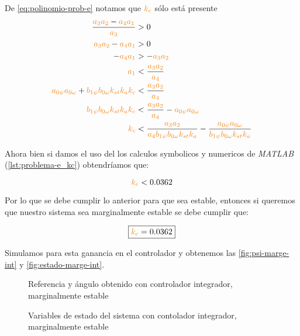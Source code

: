 De \eqref{eq:polinomio-prob-e} notamos que $\nara{k_{c}}$ sólo está presente
\begin{align} 
  \frac{\nara{a_3 a_2} - \nara{a_4 a_1}}{\nara{a_3}} &> 0 \\
  \nara{a_3 a_2} - \nara{a_4 a_1} &> 0 \\
  - \nara{a_4 a_1} &> - \nara{a_3 a_2} \\
  \nara{a_1} &< \frac{\nara{a_3 a_2}}{\nara{a_4}} \\
  \nara{a_{0\psi} a_{0\omega}} + \nara{b_{1\psi} b_{0\omega} k_{st} k_a k_c} &< \frac{\nara{a_3 a_2}}{\nara{a_4}} \\
  \nara{b_{1\psi} b_{0\omega} k_{st} k_a k_c} &< \frac{\nara{a_3 a_2}}{\nara{a_4}} - \nara{a_{0\psi} a_{0\omega}} \\
  \nara{k_c}  &< \frac{\nara{a_3 a_2}}{\nara{a_4 b_{1\psi} b_{0\omega} k_{st} k_a}}  - \frac{\nara{a_{0\psi} a_{0\omega}}}{\nara{b_{1\psi} b_{0\omega} k_{st} k_a}}  \\
\end{align}

Ahora bien si damos el uso del los calculos symbolicos y numericos de \textit{MATLAB}
(\autoref{lst:problema-e_kc}) obtendríamos que: 

\begin{equation}
  \nara{k_c} < 0.0362
\end{equation}

Por lo que se debe cumplir lo anterior para que sea estable, entonces si queremos que nuestro sistema sea marginalmente estable se debe cumplir que:

\begin{equation}
  \boxed{\nara{k_c} = 0.0362}
\end{equation}

Simulamos para esta ganancia en el controlador y obtenemos las \autoref{fig:psi-marge-int}
y \autoref{fig:estado-marge-int}.

\begin{figure}[h]
  \centering
  
  \caption{Referencia y ángulo obtenido con controlador integrador, marginalmente estable}\label{fig:psi-marge-int}
\end{figure}

\begin{figure}[h]
  \centering
  
  \caption{Variables de estado del sistema con contolador integrador, marginalmente estable}\label{fig:estado-marge-int}
\end{figure}

